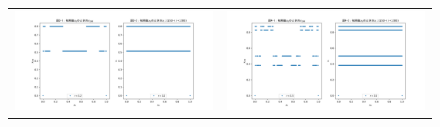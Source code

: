 \begin{figure}[htbp]
\begin{tabular}{cc}
    \begin{minipage}[t]{0.45\hsize}
      \centering
      \includegraphics[keepaspectratio, scale=0.25]{images/Problem2/ctest3_3.png}
    \end{minipage} &
    \begin{minipage}[t]{0.45\hsize}
      \centering
      \includegraphics[keepaspectratio, scale=0.25]{images/Problem2/ctest3_4.png}
    \end{minipage} \\


\end{tabular}
\end{figure}
